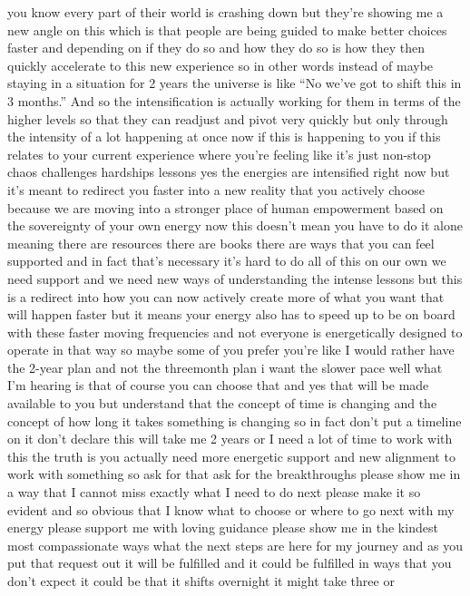 \documentclass{article}
\begin{document}
you know every part of their world is crashing down but they're showing
me a new angle on this which is that people are being guided to make
better choices faster and depending on if they do so and how they do so
is how they then quickly accelerate to this new experience so in other
words instead of maybe staying in a situation for 2 years the universe
is like ``No we've got to shift this in 3 months.'' And so the
intensification is actually working for them in terms of the higher
levels so that they can readjust and pivot very quickly but only through
the intensity of a lot happening at once now if this is happening to you
if this relates to your current experience where you're feeling like
it's just non-stop chaos challenges hardships lessons yes the energies
are intensified right now but it's meant to redirect you faster into a
new reality that you actively choose because we are moving into a
stronger place of human empowerment based on the sovereignty of your own
energy now this doesn't mean you have to do it alone meaning there are
resources there are books there are ways that you can feel supported and
in fact that's necessary it's hard to do all of this on our own we need
support and we need new ways of understanding the intense lessons but
this is a redirect into how you can now actively create more of what you
want that will happen faster but it means your energy also has to speed
up to be on board with these faster moving frequencies and not everyone
is energetically designed to operate in that way so maybe some of you
prefer you're like I would rather have the 2-year plan and not the
threemonth plan i want the slower pace well what I'm hearing is that of
course you can choose that and yes that will be made available to you
but understand that the concept of time is changing and the concept of
how long it takes something is changing so in fact don't put a timeline
on it don't declare this will take me 2 years or I need a lot of time to
work with this the truth is you actually need more energetic support and
new alignment to work with something so ask for that ask for the
breakthroughs please show me in a way that I cannot miss exactly what I
need to do next please make it so evident and so obvious that I know
what to choose or where to go next with my energy please support me with
loving guidance please show me in the kindest most compassionate ways
what the next steps are here for my journey and as you put that request
out it will be fulfilled and it could be fulfilled in ways that you
don't expect it could be that it shifts overnight it might take three or
\end{document}
